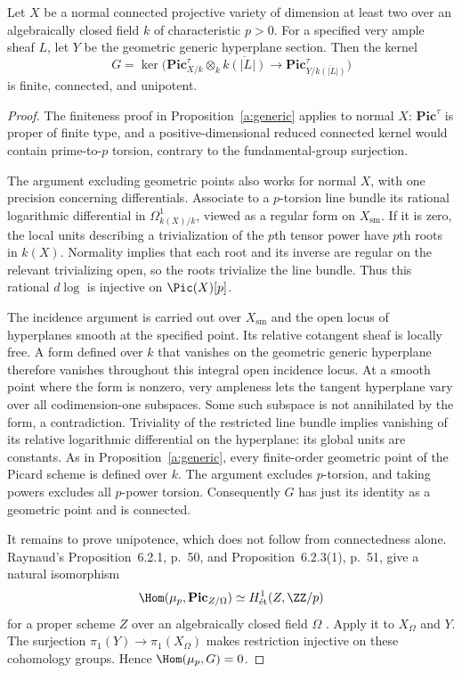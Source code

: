 \begin{proposition}
Let $X$ be a normal connected projective variety of dimension at least
two over an algebraically closed field $k$ of characteristic $p>0$.
For a specified very ample sheaf $L$, let $Y$ be the geometric generic
hyperplane section. Then the kernel
\[
 G=\ker\bigl(\mathbf{Pic}^{\tau}_{X/k}\otimes_k\overline{k(|L|)}
          \longrightarrow\mathbf{Pic}^{\tau}_{Y/\overline{k(|L|)}}\bigr)
\]
is finite, connected, and unipotent.
\end{proposition}
\begin{proof}
The finiteness proof in Proposition~\ref{a:generic} applies to normal
$X$: $\mathbf{Pic}^{\tau}$ is proper of finite type, and a
positive-dimensional reduced connected kernel would contain
prime-to-$p$ torsion, contrary to the fundamental-group surjection.

The argument excluding geometric points also works for normal $X$,
with one precision concerning differentials. Associate to a
$p$-torsion line bundle its rational logarithmic differential in
$\Omega^1_{k(X)/k}$, viewed as a regular form on $X_{\mathrm{sm}}$.
If it is zero, the local units describing a trivialization of the
$p$th tensor power have $p$th roots in $k(X)$. Normality implies that
each root and its inverse are regular on the relevant trivializing
open, so the roots trivialize the line bundle. Thus this rational
$d\log$ is injective on $\Pic(X)[p]$.

The incidence argument is carried out over $X_{\mathrm{sm}}$ and the
open locus of hyperplanes smooth at the specified point. Its relative
cotangent sheaf is locally free. A form defined over $k$ that vanishes
on the geometric generic hyperplane therefore vanishes throughout
this integral open incidence locus. At a smooth point where the form
is nonzero, very ampleness lets the tangent hyperplane vary over all
codimension-one subspaces. Some such subspace is not annihilated by
the form, a contradiction. Triviality of the restricted line bundle
implies vanishing of its relative logarithmic differential on the
hyperplane: its global units are constants. As in
Proposition~\ref{a:generic}, every finite-order geometric point of the
Picard scheme is defined over $k$. The argument excludes $p$-torsion,
and taking powers excludes all $p$-power torsion. Consequently $G$
has just its identity as a geometric point and is connected.

It remains to prove unipotence, which does not follow from
connectedness alone. Raynaud's Proposition~6.2.1, p.~50, and
Proposition~6.2.3(1), p.~51, give a natural isomorphism
\[
 \Hom(\mu_p,\mathbf{Pic}_{Z/\Omega})
       \simeq H^1_{\text{ét}}(Z,\ZZ/p)
\]
for a proper scheme $Z$ over an algebraically closed field $\Omega$
\cite{Raynaud1970PicardDuality}. Apply it to $X_\Omega$ and $Y$.
The surjection $\pi_1(Y)\to\pi_1(X_\Omega)$ makes restriction
injective on these cohomology groups. Hence $\Hom(\mu_p,G)=0$.


\end{proof}
